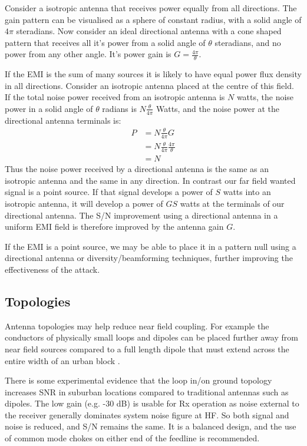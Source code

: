 \documentclass{article}
\begin{document}
Consider a isotropic antenna that receives power equally from all directions.  The gain pattern can be visualised as a sphere of constant radius, with a solid angle of $4 \pi$ steradians. Now consider an ideal directional antenna with a cone shaped pattern that receives all it's power from a solid angle of $\theta$ steradians, and no power from any other angle.  It's power gain is $G=\frac{4 \pi}{\theta}$. 

If the EMI is the sum of many sources it is likely to have equal power flux density in all directions.  Consider an isotropic antenna placed at the centre of this field. If the total noise power received from an isotropic antenna is $N$ watts, the noise power in a solid angle of $\theta$ radians is $N \frac{\theta}{4 \pi}$ Watts, and the noise power at the directional antenna terminals is:
\begin{equation}
\begin{split}
 P &= N \frac{\theta}{4 \pi} G \\
   &= N \frac{\theta}{4 \pi} \frac{4 \pi}{\theta} \\
   &= N
\end{split}
\end{equation}
Thus the noise power received by a directional antenna is the same as an isotropic antenna and the same in any direction. In contrast our far field wanted signal is a point source. If that signal develops a power of $S$ watts into an isotropic antenna, it will develop a power of $GS$ watts at the terminals of our directional antenna. The S/N improvement using a directional antenna in a uniform EMI field is therefore improved by the antenna gain $G$.

If the EMI is a point source, we may be able to place it in a pattern null using a directional antenna or diversity/beamforming techniques, further improving the effectiveness of the attack.

\subsection{Topologies}

Antenna topologies may help reduce near field coupling.  For example the conductors of physically small loops and dipoles can be placed further away from near field sources compared to a full length dipole that must extend across the entire width of an urban block \cite{lz1aq}.

There is some experimental evidence that the loop in/on ground topology \cite{k5jy_log}\cite{duffy_lig} increases SNR in suburban locations compared to traditional antennas such as dipoles.  The low gain (e.g. -30 dB) is usable for Rx operation as noise external to the receiver generally dominates system noise figure at HF. So both signal and noise is reduced, and S/N remains the same. It is a balanced design, and the use of common mode chokes on either end of the feedline is recommended.
\end{document}
